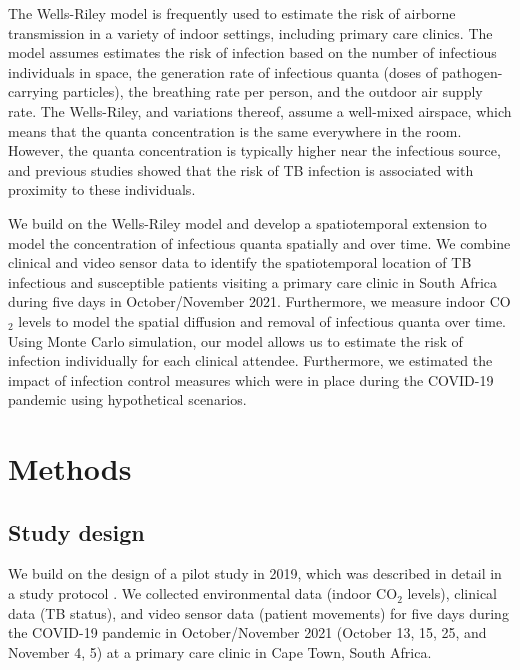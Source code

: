 \documentclass[fleqn,11pt]{wlscirep}
\begin{document}
The Wells-Riley model\cite{Riley1978AJE} is frequently used to estimate the risk of airborne transmission in a variety of indoor settings\cite{Andrews2014JID,Taylor2016IJTLD,Hella2017JInfect,Zemouri2020JDR}, including primary care clinics\cite{Zurcher2022JID,McCreesh2021BMJGlobalHealth}. The model assumes estimates the risk of infection based on the number of infectious individuals in space, the generation rate of infectious quanta (doses of pathogen-carrying particles), the breathing rate per person, and the outdoor air supply rate. The Wells-Riley, and variations thereof\cite{Rudnick2003IndoorAir}, assume a well-mixed airspace, which means that the quanta concentration is the same everywhere in the room. However, the quanta concentration is typically higher near the infectious source\cite{Wang2021Science,Vuorinen2020SafSci,Chen2020BuildEnv}, and previous studies showed that the risk of TB infection is associated with proximity to these individuals\cite{Ko2004RiskAnal,Kenyon1996NEJM}.

We build on the Wells-Riley model and develop a spatiotemporal extension to model the concentration of infectious quanta spatially and over time. We combine clinical and video sensor data to identify the spatiotemporal location of TB infectious and susceptible patients visiting a primary care clinic in South Africa during five days in October/November 2021. Furthermore, we measure indoor CO$_2$ levels to model the spatial diffusion and removal of infectious quanta over time. Using Monte Carlo simulation, our model allows us to estimate the risk of infection individually for each clinical attendee. Furthermore, we estimated the impact of infection control measures which were in place during the COVID-19 pandemic using hypothetical scenarios.

\newpage

\section{Methods}

\subsection{Study design}

We build on the design of a pilot study in 2019\cite{Zurcher2022JID}, which was described in detail in a study protocol \cite{Zurcher2020BMJ}. We collected environmental data (indoor CO$_2$ levels), clinical data (TB status), and video sensor data (patient movements) for five days during the COVID-19 pandemic in October/November 2021 (October 13, 15, 25, and November 4, 5) at a primary care clinic in Cape Town, South Africa. 
\end{document}
